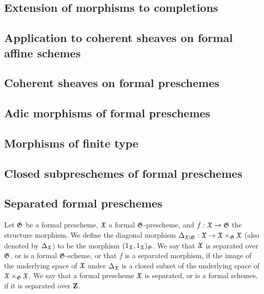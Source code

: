 \subsection{Extension of morphisms to completions}
\label{subsection-extension-of-morphisms-to-completions}

\subsection{Application to coherent sheaves on formal affine schemes}
\label{subsection-application-to-coherent-sheaves-on-formal-affine-schemes}

\subsection{Coherent sheaves on formal preschemes}
\label{subsection-coherent-sheaves-on-formal-preschemes}

\subsection{Adic morphisms of formal preschemes}
\label{subsection-adic-morphisms-of-formal-preschemes}

\subsection{Morphisms of finite type}
\label{subsection-morphisms-of-finite-type}

\subsection{Closed subpreschemes of formal preschemes}
\label{subsection-closed-subpreschemes-of-formal-preschemes}

\subsection{Separated formal preschemes}
\label{subsection-separated-formal-preschemes}

\begin{defn}[10.15.1]
\label{1.10.15.1}
Let $\mathfrak{G}$ be a formal prescheme, $\mathfrak{X}$ a formal $\mathfrak{G}$-prescheme, and $f:\fk{X}\to\fk{G}$ the structure morphism.
We define the diagonal morphism $\Delta_{\fk{X}|\fk{G}}:\fk{X}\to\fk{X}\times_\fk{G}\fk{X}$ (also denoted by $\Delta_\mathfrak{X}$) to be the morphism $(1_\mathfrak{X},1_\mathfrak{X})_\mathfrak{G}$.
We say that $\mathfrak{X}$ is separated over $\mathfrak{G}$, or is a formal $\mathfrak{G}$-scheme, or that $f$ is a separated morphism, if the image of the underlying space of $\mathfrak{X}$ under $\Delta_\mathfrak{X}$ is a closed subset of the underlying space of $\mathfrak{X}\times_\mathfrak{G}\mathfrak{X}$.
We say that a formal prescheme $\mathfrak{X}$ is separated, or is a formal schemes, if it is separated over $\mathbf{Z}$.
\end{defn}

